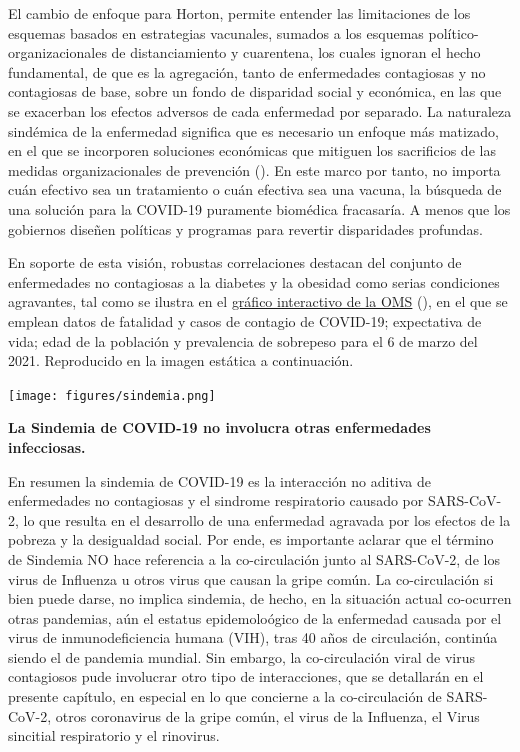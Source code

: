 \documentclass[
  12pt, krantz2,
  spanish,
]{krantz}
\begin{document}
El cambio de enfoque para Horton, permite entender las limitaciones de los esquemas basados en estrategias vacunales, sumados a los esquemas político-organizacionales de distanciamiento y cuarentena, los cuales ignoran el hecho fundamental, de que es la agregación, tanto de enfermedades contagiosas y no contagiosas de base, sobre un fondo de disparidad social y económica, en las que se exacerban los efectos adversos de cada enfermedad por separado. La naturaleza sindémica de la enfermedad significa que es necesario un enfoque más matizado, en el que se incorporen soluciones económicas que mitiguen los sacrificios de las medidas organizacionales de prevención (\citet{horton2020offline}). En este marco por tanto, no importa cuán efectivo sea un tratamiento o cuán efectiva sea una vacuna, la búsqueda de una solución para la COVID-19 puramente biomédica fracasaría. A menos que los gobiernos diseñen políticas y programas para revertir disparidades profundas.

En soporte de esta visión, robustas correlaciones destacan del conjunto de enfermedades no contagiosas a la diabetes y la obesidad como serias condiciones agravantes, tal como se ilustra en el \href{https://public.flourish.studio/visualisation/5483097/}{gráfico interactivo de la OMS} (\citet{CDC_2022}), en el que se emplean datos de fatalidad y casos de contagio de COVID-19; expectativa de vida; edad de la población y prevalencia de sobrepeso para el 6 de marzo del 2021. Reproducido en la imagen estática a continuación.

\texttt{[image: figures/sindemia.png]}

\textbf{La Sindemia de COVID-19 no involucra otras enfermedades infecciosas.}

En resumen la sindemia de COVID-19 es la interacción no aditiva de enfermedades no contagiosas y el sindrome respiratorio causado por SARS-CoV-2, lo que resulta en el desarrollo de una enfermedad agravada por los efectos de la pobreza y la desigualdad social. Por ende, es importante aclarar que el término de Sindemia NO hace referencia a la co-circulación junto al SARS-CoV-2, de los virus de Influenza u otros virus que causan la gripe común. La co-circulación si bien puede darse, no implica sindemia, de hecho, en la situación actual co-ocurren otras pandemias, aún el estatus epidemoloógico de la enfermedad causada por el virus de inmunodeficiencia humana (VIH), tras 40 años de circulación, continúa siendo el de pandemia mundial. Sin embargo, la co-circulación viral de virus contagiosos pude involucrar otro tipo de interacciones, que se detallarán en el presente capítulo, en especial en lo que concierne a la co-circulación de SARS-CoV-2, otros coronavirus de la gripe común, el virus de la Influenza, el Virus sincitial respiratorio y el rinovirus.

\backmatter

  
\end{document}
